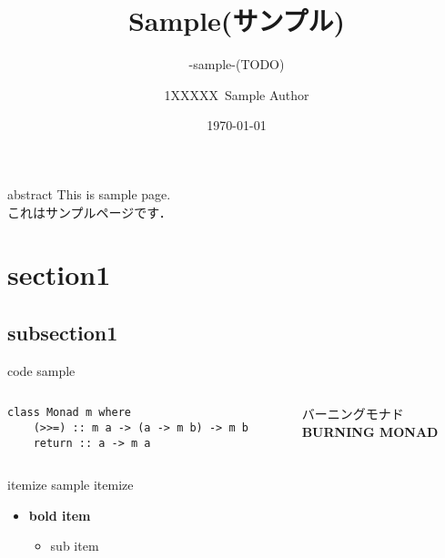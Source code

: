 \documentclass[aspectratio=1610,dvipdfmx,ja=standard]{beamer}
\title{%
    Sample(サンプル)
}
\subtitle{
    -sample-(TODO)
}
\institute[Sample Univ.]{%
    Sample Univ. 
}
\author{%
    1XXXXX\ Sample Author
}
\date{%
    \today
}
\begin{document}
%
%
\begin{frame}
\maketitle 
\end{frame}

\begin{frame}[fragile]{abstract}
    \fontsize{18pt}{24pt}\selectfont
This is sample page.\\[6pt] 
これはサンプルページです．
\end{frame}

\section{section1}
\subsection{subsection1}

\begin{frame}
    \tableofcontents[currentsection]
\end{frame}

\begin{frame}[fragile]{code sample}
    \begin{columns}
        \begin{column}{0.5\textwidth}
            \begin{lstlisting}
class Monad m where 
    (>>=) :: m a -> (a -> m b) -> m b 
    return :: a -> m a
            \end{lstlisting}
        \end{column}
        \begin{column}{0.5\textwidth}
            バーニングモナド \\
            \textbf{BURNING MONAD}
        \end{column}
    \end{columns}
\end{frame}

\begin{frame}{itemize sample}
    itemize
    \begin{itemize}
        \item \textbf{bold item}
        \begin{itemize}
            \item sub item
        \end{itemize}
    \end{itemize}
\end{frame}
\end{document}
